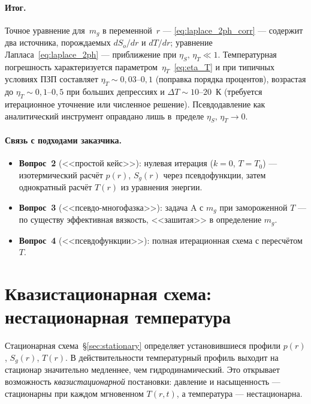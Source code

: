 ﻿\documentclass[12pt,a4paper]{article}
\begin{document}
\paragraph{Итог.}
Точное уравнение для~$m_g$ в переменной~$r$ ---
\eqref{eq:laplace_2ph_corr} --- содержит два источника,
порождаемых $dS_o/dr$ и $dT/dr$; уравнение
Лапласа~\eqref{eq:laplace_2ph} --- приближение
при $\eta_S,\,\eta_T \ll 1$. Температурная погрешность
характеризуется параметром~$\eta_T$~\eqref{eq:eta_T}
и при типичных условиях ПЗП составляет
$\eta_T \sim 0{,}03$--$0{,}1$ (поправка порядка процентов),
возрастая до $\eta_T \sim 0{,}1$--$0{,}5$ при больших
депрессиях и $\Delta T \sim 10$--$20$~К (требуется
итерационное уточнение или численное решение).
Псевдодавление как аналитический инструмент оправдано
лишь в~пределе $\eta_S,\,\eta_T \to 0$.

\paragraph{Связь с подходами заказчика.}
\begin{itemize}[nosep]
  \item \textbf{Вопрос~2} (<<простой кейс>>): нулевая
        итерация ($k = 0$, $T = T_0$) --- изотермический
        расчёт $p(r)$, $S_g(r)$ через псевдофункции,
        затем однократный расчёт $T(r)$ из уравнения
        энергии.
  \item \textbf{Вопрос~3} (<<псевдо-многофазка>>):
        задача A с $m_g$ при замороженной $T$ ---
        по существу эффективная вязкость,
        <<зашитая>> в определение $m_g$.
  \item \textbf{Вопрос~4} (<<псевдофункции>>):
        полная итерационная схема с пересчётом $T$.
\end{itemize}


\section{Квазистационарная схема: нестационарная температура}
\label{sec:quasistationary}

Стационарная схема~\S\ref{sec:stationary} определяет
установившиеся профили $p(r)$, $S_g(r)$, $T(r)$.
В действительности температурный профиль выходит
на стационар значительно медленнее, чем гидродинамический.
Это открывает возможность \emph{квазистационарной} постановки:
давление и насыщенность --- стационарны при каждом
мгновенном $T(r,t)$, а температура --- нестационарна.
\end{document}
